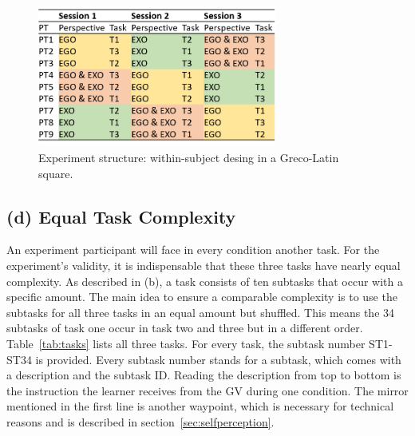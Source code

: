 \begin{figure}[htb]
	\centering
	\includegraphics[width=0.7\textwidth]{figures/study_session_plan.png}
	\caption[Experiment structure]{Experiment structure: within-subject desing in a Greco-Latin square.}
	\label{fig:study_session_plan}
\end{figure}

\subsection{(d) Equal Task Complexity}
An experiment participant will face in every condition another task. For the experiment's validity, it is indispensable that these three tasks have nearly equal complexity. As described in (b), a task consists of ten subtasks that occur with a specific amount. The main idea to ensure a comparable complexity is to use the subtasks for all three tasks in an equal amount but shuffled. This means the 34 subtasks of task one occur in task two and three but in a different order. Table~\ref{tab:tasks} lists all three tasks. For every task, the subtask number ST1-ST34 is provided. Every subtask number stands for a subtask, which comes with a description and the subtask ID. Reading the description from top to bottom is the instruction the learner receives from the GV during one condition. The mirror mentioned in the first line is another waypoint, which is necessary for technical reasons and is described in section~\ref{sec:selfperception}.

